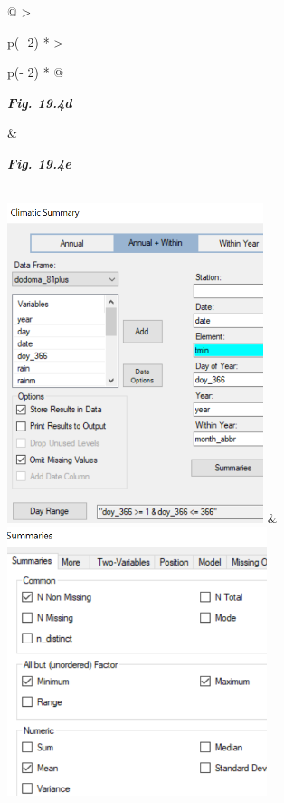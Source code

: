 \documentclass[
  letterpaper,
  DIV=11,
  numbers=noendperiod]{scrreprt}
\begin{document}
\begin{longtable}[]{@{}
  >{\raggedright\arraybackslash}p{(\columnwidth - 2\tabcolsep) * }
  >{\raggedright\arraybackslash}p{(\columnwidth - 2\tabcolsep) * }@{}}
\toprule\noalign{}
\begin{minipage}[b]{\linewidth}\raggedright
\textbf{\emph{Fig. 19.4d}}
\end{minipage} & \begin{minipage}[b]{\linewidth}\raggedright
\textbf{\emph{Fig. 19.4e}}
\end{minipage} \\
\midrule\noalign{}
\endhead
\bottomrule\noalign{}
\endlastfoot
\includegraphics[width=2.94936in,height=3.67289in]{figures/Fig19.4d.png}
&
\includegraphics[width=2.99394in,height=3.0913in]{figures/Fig19.4e.png} \\
\end{longtable}
\end{document}
